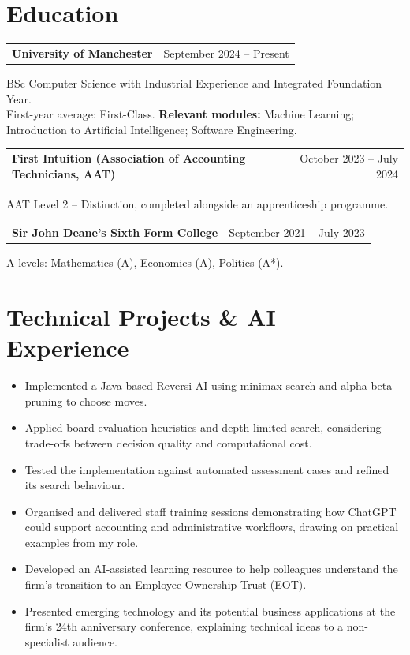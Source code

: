 \documentclass[11pt,a4paper]{article}
\makeatletter
\newcommand{\datedheading}[2]{%
 \noindent\begin{tabularx}{\linewidth}{@{}>{\raggedright\arraybackslash}X>{\raggedleft\arraybackslash}r@{}}
 \textbf{#1} & {\small\color{muted}#2}
 \end{tabularx}\par
}
\newcommand{\projectheading}[1]{\needspace{5\baselineskip}\vspace{3pt}{\bfseries #1}\par\vspace{-1pt}}
\makeatother
\begin{document}
\section*{Education}
\datedheading{University of Manchester}{September 2024 -- Present}
BSc Computer Science with Industrial Experience and Integrated Foundation Year.\\
First-year average: First-Class. \textbf{Relevant modules:} Machine Learning; Introduction to Artificial Intelligence; Software Engineering.
\vspace{5pt}

\datedheading{First Intuition \textnormal{(Association of Accounting Technicians, AAT)}}{October 2023 -- July 2024}
AAT Level 2 -- Distinction, completed alongside an apprenticeship programme.
\vspace{5pt}

\datedheading{Sir John Deane's Sixth Form College}{September 2021 -- July 2023}
A-levels: Mathematics (A), Economics (A), Politics (A*).

\section*{Technical Projects \& AI Experience}
\projectheading{Reversi AI -- University of Manchester}
\begin{itemize}
 \item Implemented a Java-based Reversi AI using minimax search and alpha-beta pruning to choose moves.
 \item Applied board evaluation heuristics and depth-limited search, considering trade-offs between decision quality and computational cost.
 \item Tested the implementation against automated assessment cases and refined its search behaviour.
\end{itemize}

\newpage
\projectheading{AI Integration \& Workplace Efficiency -- Walker Begley}
\begin{itemize}
 \item Organised and delivered staff training sessions demonstrating how ChatGPT could support accounting and administrative workflows, drawing on practical examples from my role.
 \item Developed an AI-assisted learning resource to help colleagues understand the firm's transition to an Employee Ownership Trust (EOT).
 \item Presented emerging technology and its potential business applications at the firm's 24th anniversary conference, explaining technical ideas to a non-specialist audience.
\end{itemize}
\end{document}
